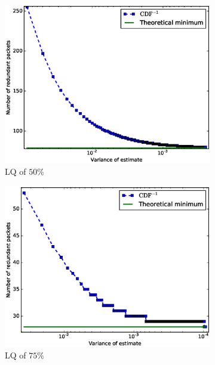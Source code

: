\documentclass[10pt,a4paper]{article}
\begin{document}
\begin{figure}
	\centering
	\begin{subfigure}[b]{0.3\textwidth}
		\includegraphics[width=\textwidth]{prediction/converge-0-5}
		\caption{LQ of $50\%$}
	\end{subfigure}
  \begin{subfigure}[b]{0.3\textwidth}
		\includegraphics[width=\textwidth]{prediction/converge-0-75}
		\caption{LQ of $75\%$}
	\end{subfigure}
  \begin{subfigure}[b]{0.3\textwidth}

\end{subfigure}
\end{figure}
\end{document}
